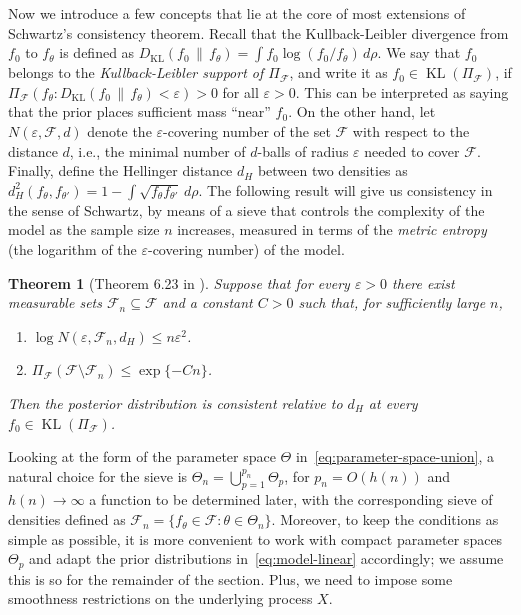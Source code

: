 \documentclass{article}
\numberwithin{equation}{section}
\theoremstyle{plain}
\newtheorem{theorem}{Theorem}
\theoremstyle{definition}
\renewcommand{\epsilon}{\varepsilon}
\DeclareMathOperator{\KL} {KL}
\begin{document}
Now we introduce a few concepts that lie at the core of most extensions of Schwartz's consistency theorem. Recall that the Kullback-Leibler divergence from \(f_0\) to \(f_\theta\) is defined as \(D_{\mathrm{KL}}(f_0 \,\|\, f_\theta) = \int f_0 \log (f_0/f_\theta)\, d\rho\). We say that \(f_0\) belongs to the \textit{Kullback-Leibler support of \(\Pi_{\mathcal F}\)}, and write it as \(f_0 \in \operatorname{KL}(\Pi_{\mathcal F})\), if \(\Pi_{\mathcal F}\left(f_\theta: D_{\mathrm{KL}}(f_0 \,\|\, f_\theta) < \epsilon\right) > 0\) for all \(\epsilon > 0\). This can be interpreted as saying that the prior places sufficient mass ``near'' \(f_0\). On the other hand, let \(N(\epsilon, \mathcal F, d)\) denote the \(\epsilon\)-covering number of the set \(\mathcal F\) with respect to the distance \(d\), i.e., the minimal number of \(d\)-balls of radius \(\epsilon\) needed to cover \(\mathcal F\). Finally, define the Hellinger distance \(d_H\) between two densities as \(d^2_H(f_\theta, f_{\theta'}) = 1 - \int \sqrt{f_\theta f_{\theta'}}\, d\rho\). The following result will give us consistency in the sense of Schwartz, by means of a sieve that controls the complexity of the model as the sample size \(n\) increases, measured in terms of the \textit{metric entropy} (the logarithm of the \(\epsilon\)-covering number) of the model.

\begin{theorem}[Theorem 6.23 in \citet{ghosal2017fundamentals}]\label{th:consistency-hellinger}
  Suppose that for every \(\epsilon > 0\) there exist measurable sets \(\mathcal F_n \subseteq \mathcal F\) and a constant \(C>0\) such that, for sufficiently large \(n\),
  \begin{enumerate}[label=(\roman*)]
    \item \(\log N(\epsilon, \mathcal F_n, d_H) \leq n\epsilon^2\).
    \item \(\Pi_{\mathcal F}(\mathcal F \setminus \mathcal F_n) \leq \exp\{-Cn\}\).
  \end{enumerate}
Then the posterior distribution is consistent relative to \(d_H\) at every \(f_0\in \KL(\Pi_{\mathcal F})\).
\end{theorem}

Looking at the form of the parameter space \(\Theta\) in~\eqref{eq:parameter-space-union}, a natural choice for the sieve is \(\Theta_n = \bigcup_{p=1}^{p_n} \Theta_p\), for \(p_n=O(h(n))\) and \(h(n)\to \infty\) a function to be determined later, with the corresponding sieve of densities defined as \(\mathcal F_n=\{f_\theta\in\mathcal F: \theta \in \Theta_n \}\). Moreover, to keep the conditions as simple as possible, it is more convenient to work with compact parameter spaces \(\Theta_p\) and adapt the prior distributions in~\eqref{eq:model-linear} accordingly; we assume this is so for the remainder of the section. Plus, we need to impose some smoothness restrictions on the underlying process \(X\).
\end{document}

